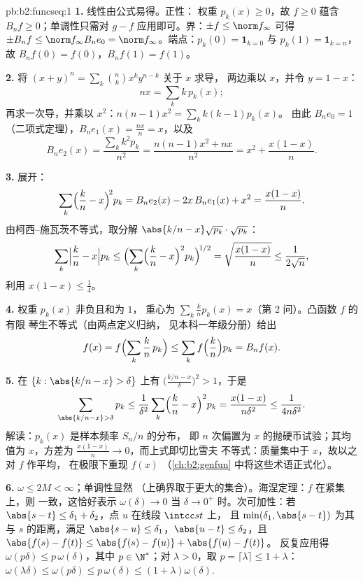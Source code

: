 \begin{solution}{pb:b2:funcseq:1}
\textbf{1.} 线性由公式易得。正性：
权重 $p_k(x) \geq 0$，故 $f \geq 0$ 蕴含 $B_nf \geq
0$；单调性只需对 $g - f$ 应用即可。界：$\pm f \leq
\norm f_\infty$ 可得 $\pm B_nf \leq \norm f_\infty B_ne_0 =
\norm f_\infty$。端点：$p_k(0) = \mathbf 1_{k=0}$ 与
$p_k(1) = \mathbf 1_{k=n}$，故 $B_nf(0) = f(0)$，$B_nf(1) =
f(1)$。

\textbf{2.} 将 $(x+y)^n = \sum_k\binom nk x^ky^{n-k}$ 关于 $x$ 求导，
两边乘以 $x$，并令 $y = 1 - x$：
\[
nx = \sum_k k\,p_k(x) ;
\]
再求一次导，并乘以 $x^2$：$n(n-1)x^2 = \sum_k k(k-1)p_k(x)$。
由此 $B_ne_0 = 1$（二项式定理），$B_ne_1(x) =
\frac{nx}{n} = x$，以及
\[
B_ne_2(x) = \frac{\sum_k k^2p_k}{n^2}
= \frac{n(n-1)x^2 + nx}{n^2}
= x^2 + \frac{x(1-x)}{n} .
\]

\textbf{3.} 展开：
\[
\sum_k\Bigl(\frac kn - x\Bigr)^{\!2} p_k
= B_ne_2(x) - 2x\,B_ne_1(x) + x^2
= \frac{x(1-x)}{n} .
\]
由柯西–施瓦茨不等式，取分解 $\abs{k/n - x}\sqrt{p_k}
\cdot \sqrt{p_k}$：
\[
\sum_k\Bigl|\frac kn - x\Bigr| p_k
\leq \Bigl(\sum_k\Bigl(\frac kn - x\Bigr)^2
p_k\Bigr)^{\!1/2}
= \sqrt{\frac{x(1-x)}{n}} \leq \frac{1}{2\sqrt n},
\]
利用 $x(1-x) \leq \frac14$。

\textbf{4.} 权重 $p_k(x)$ 非负且和为 $1$，
重心为 $\sum_k \frac kn p_k(x) = x$（第 2 问）。凸函数 $f$ 的有限
琴生不等式（由两点定义归纳，
见本科一年级分册）给出
\[
f(x) = f\Bigl(\sum_k \frac kn\,p_k\Bigr)
\leq \sum_k f\Bigl(\frac kn\Bigr)p_k = B_nf(x) .
\]

\textbf{5.} 在 $\{k : \abs{k/n - x} > \delta\}$ 上有
$\bigl(\frac{k/n - x}{\delta}\bigr)^2 > 1$，于是
\[
\sum_{\abs{k/n-x}>\delta} p_k
\leq \frac{1}{\delta^2}\sum_k\Bigl(\frac kn -
x\Bigr)^2p_k
= \frac{x(1-x)}{n\delta^2} \leq \frac{1}{4n\delta^2} .
\]
解读：$p_k(x)$ 是样本频率 $S_n/n$ 的分布，
即 $n$ 次偏置为 $x$ 的抛硬币试验；其均值为 $x$，方差为
$\frac{x(1-x)}n \to 0$，而上式即切比雪夫
不等式：质量集中于 $x$，故以之对 $f$ 作平均，
在极限下重现 $f(x)$
（\cref{ch:b2:genfun} 中将这些术语正式化）。

\textbf{6.} $\omega \leq 2M < \infty$；单调性显然
（上确界取于更大的集合）。海涅定理：$f$ 在紧集上，则
一致，这恰好表示 $\omega(\delta) \to 0$
当 $\delta \to 0^+$ 时。次可加性：若 $\abs{s - t} \leq
\delta_1 + \delta_2$，点 $u$ 在线段 $\intcc st$ 上，
且 $\min(\delta_1, \abs{s-t})$ 为其与 $s$ 的距离，满足
$\abs{s-u} \leq \delta_1$，$\abs{u-t} \leq \delta_2$，且
$\abs{f(s)-f(t)} \leq \abs{f(s)-f(u)} + \abs{f(u)-f(t)}$。
反复应用得 $\omega(p\delta) \leq p\,\omega(\delta)$，其中 $p \in
\N^*$；对 $\lambda > 0$，取 $p = \lceil\lambda\rceil \leq 1
+ \lambda$：$\omega(\lambda\delta) \leq \omega(p\delta) \leq
p\,\omega(\delta) \leq (1+\lambda)\omega(\delta)$.


\end{solution}
